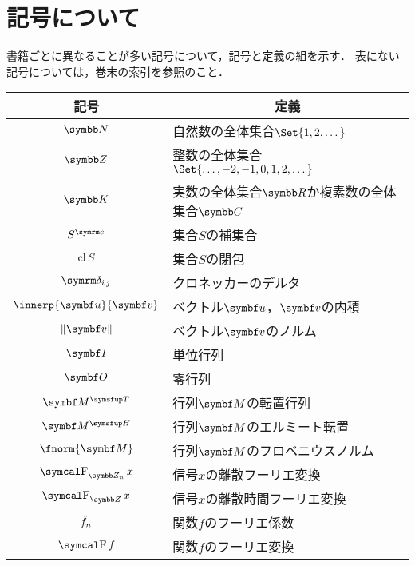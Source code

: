 \documentclass[../../main]{subfiles}
\begin{document}
\chapter{記号について}
\thispagestyle{empty}
書籍ごとに異なることが多い記号について，記号と定義の組を示す．
表にない記号については，巻末の索引を参照のこと．

\vspace*{\fill}
\begin{table*}
  \centering
  \begin{tabular}{c|l} \hline
    記号 & \multicolumn{1}{c}{定義} \\ \hline
    \(\numset{N}\) & 自然数の全体集合\(\Set{1,2,\dotsc}\) \\
    \(\numset{Z}\) & 整数の全体集合\(\Set{\dotsc,-2,-1,0,1,2,\dotsc}\) \\
    \(\numset{K}\) & 実数の全体集合\(\numset{R}\)か複素数の全体集合\(\numset{C}\) \\
    \(\scomp{S}\) & 集合\(S\)の補集合 \\
    \(\operatorname{cl} S\) & 集合\(S\)の閉包 \\
    \(\kdelta{i}{j}\) & クロネッカーのデルタ \\
    \(\innerp{\vect{u}}{\vect{v}}\) & ベクトル\(\vect{u}\)，\(\vect{v}\)の内積 \\
    \(\vnorm{\vect{v}}\) & ベクトル\(\vect{v}\)のノルム \\
    \(\imat\) & 単位行列 \\
    \(\zmat\) & 零行列 \\
    \(\trps{\mat{M}}\) & 行列\(\mat{M}\)の転置行列 \\
    \(\htrps{\mat{M}}\) & 行列\(\mat{M}\)のエルミート転置 \\
    \(\fnorm{\mat{M}}\) & 行列\(\mat{M}\)のフロベニウスノルム \\
    \(\dft{n}{x}\) & 信号\(x\)の離散フーリエ変換 \\
    \(\dtft x\) & 信号\(x\)の離散時間フーリエ変換 \\
    \(\hat{f}_n\) & 関数\(f\)のフーリエ係数 \\
    \(\ftrans f\) & 関数\(f\)のフーリエ変換 \\ \hline
  \end{tabular}
\end{table*}
\vspace*{\fill}
\end{document}
